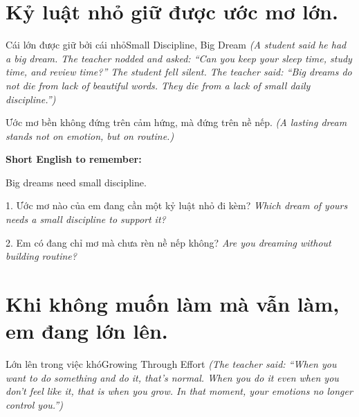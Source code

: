 \section{Kỷ luật nhỏ giữ được ước mơ lớn.}
\begin{truyen}{Cái lớn được giữ bởi cái nhỏ}{Small Discipline, Big Dream}
\textit{(A student said he had a big dream. The teacher nodded and asked: ``Can you keep your sleep time, study time, and review time?'' The student fell silent. The teacher said: ``Big dreams do not die from lack of beautiful words. They die from a lack of small daily discipline.'')}
\end{truyen}

\begin{baihoc}
Ước mơ bền không đứng trên cảm hứng, mà đứng trên nề nếp.
\textit{(A lasting dream stands not on emotion, but on routine.)}
\end{baihoc}

\begin{ghinhoanh}
\textbf{Short English to remember:}

Big dreams need small discipline.

\end{ghinhoanh}

\begin{tuhocnhanh}
1. Ước mơ nào của em đang cần một kỷ luật nhỏ đi kèm? \textit{Which dream of yours needs a small discipline to support it?}

2. Em có đang chỉ mơ mà chưa rèn nề nếp không? \textit{Are you dreaming without building routine?}
\end{tuhocnhanh}
\ngancach

\section{Khi không muốn làm mà vẫn làm, em đang lớn lên.}
\begin{truyen}{Lớn lên trong việc khó}{Growing Through Effort}
\textit{(The teacher said: ``When you want to do something and do it, that's normal. When you do it even when you don't feel like it, that is when you grow. In that moment, your emotions no longer control you.'')}
\end{truyen}

